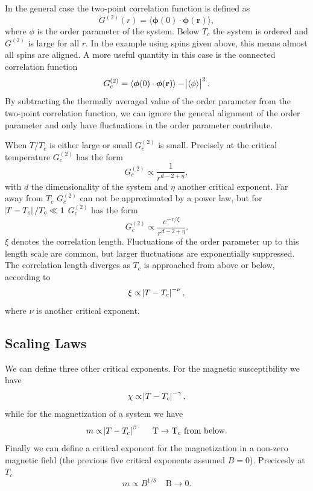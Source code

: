 \documentclass[11pt, a4paper]{report} %
\begin{document}
In the general case the two-point correlation function is defined as
\begin{equation}
	G^{(2)}(r) = \langle \boldsymbol{\phi}(0) \cdot \boldsymbol{\phi}(\mathbf{r}) \rangle,
\end{equation}
where \(\phi\) is the order parameter of the system.
Below \(T_c\) the system is ordered and \(G^{(2)}\) is large for all \(r\).
In the example using spins given above, this means almost all spins are aligned.
A more useful quantity in this case is the connected correlation function
\begin{equation}
	G_c^{(2)} = \langle \boldsymbol{\phi}(0) \cdot \boldsymbol{\phi}(\mathbf{r}) \rangle - \abs{\langle \phi \rangle}^2.
\end{equation}
By subtracting the thermally averaged value of the order parameter from the two-point correlation function, we can ignore the general alignment of the order parameter and only have fluctuations in the order parameter contribute.

When \(T/T_c\) is either large or small \(G_c^{(2)}\) is small.
Precisely at the critical temperature \(G_c^{(2)}\) has the form
\begin{equation}
	G_c^{(2)} \propto \frac{1}{r^{d-2+\eta}},
\end{equation}
with \(d\) the dimensionality of the system and \(\eta\) another critical exponent.
Far away from \(T_c\) \(G_c^{(2)}\) can not be approximated by a power law, but for \(\abs{T-T_c} / T_c \ll 1\) \(G_c^{(2)}\) has the form
\begin{equation}
	G_c^{(2)} \propto \frac{e^{-r/\xi}}{r^{d-2+\eta}}.
\end{equation}
\(\xi\) denotes the correlation length.
Fluctuations of the order parameter up to this length scale are common, but larger fluctuations are exponentially suppressed.
The correlation length diverges as \(T_c\) is approached from above or below, according to
\begin{equation}
	\xi \propto \abs{T-T_c}^{-\nu},
\end{equation}
where \(\nu\) is another critical exponent.

\subsection{Scaling Laws} \label{sec:scaling_laws}
We can define three other critical exponents.
For the magnetic susceptibility we have
\begin{equation}
	\chi \propto \abs{T-T_c}^{-\gamma},
\end{equation}
while for the magnetization of a system we have
\begin{equation}
	\label{eq:magnetization_beta}
	m \propto \abs{T-T_c}^{\beta} \mathrm{\ \ \ \ \ T \to T_c\ from\ below}.
\end{equation}
Finally we can define a critical exponent for the magnetization in a non-zero magnetic field (the previous five critical exponents assumed \(B=0\)).
Precicesly at \(T_c\)
\begin{equation}
	m \propto B^{1/\delta} \mathrm{\ \ \ \ \ B \to 0}.
\end{equation}
\end{document}
